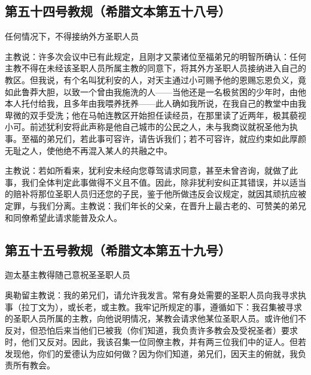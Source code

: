 
\subsection{第五十四号教规（希腊文本第五十八号）}

任何情况下，不得接纳外方圣职人员\par

主教说：许多次会议中已有此规定，且刚才又蒙诸位至福弟兄的明智所确认：任何主教不得在未经该圣职人员所属主教的同意下，将其外方圣职人员接纳进入自己的教区。但我说，有个名叫犹利安的人，对天主通过小可赐予他的恩赐忘恩负义，竟如此鲁莽大胆，以致一个曾由我施洗的人——当他还是一名极贫困的少年时，由他本人托付给我，且多年由我喂养抚养——此人确如我所说，在我自己的教堂中由我卑微的双手受洗；他在马帕连教区开始担任读经员，在那里读了近两年，极其藐视小可。前述犹利安将此声称是他自己城市的公民之人，未与我商议就祝圣他为执事。至福的弟兄们，若此事可容许，请告诉我们；若不可容许，就应约束如此厚颜无耻之人，使他绝不再混入某人的共融之中。\par

主教说：若如所看来，犹利安未经向您尊驾请求同意，甚至未曾咨询，就做了此事，我们全体判定此事做得不义且不值。因此，除非犹利安纠正其错误，并以适当的赔补将那位圣职人员归还您的子民，鉴于他所做违反会议规定，就因其顽抗应被定罪，与我们分离。主教说：我们年长的父亲，在晋升上最古老的、可赞美的弟兄和同僚希望此请求能普及众人。\par


\subsection{第五十五号教规（希腊文本第五十九号）}

迦太基主教得随己意祝圣圣职人员\par

奥勒留主教说：我的弟兄们，请允许我发言。常有身处需要的圣职人员向我寻求执事（拉丁文为），或长老，或主教。我牢记所规定的事，遵循如下：我召集被寻求的圣职人员所属的主教，向他说明情况，某教会请求他某位圣职人员。或许他们不反对，但恐怕后来当他们已被我（你们知道，我负责许多教会及受祝圣者）要求时，他们又反对。因此，我该召集一位同僚主教，并有两三位我们中的证人。但若发现他，你们的爱德认为应如何做？因为你们知道，弟兄们，因天主的俯就，我负责所有教会。\par

